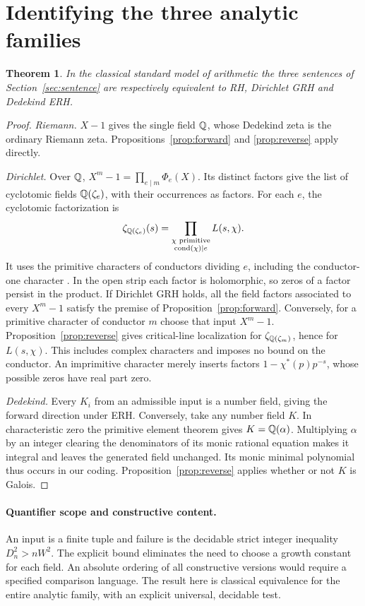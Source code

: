 \documentclass[11pt]{article}
\newtheorem{theorem}{Theorem}\newtheorem{lemma}[theorem]{Lemma}\newtheorem{proposition}[theorem]{Proposition}
\begin{document}
\section{Identifying the three analytic families}\label{sec:families}
\begin{theorem}\label{thm:main}
In the classical standard model of arithmetic the three sentences of Section~\ref{sec:sentence} are respectively equivalent to RH, Dirichlet GRH and Dedekind ERH.
\end{theorem}
\begin{proof}
\emph{Riemann.} \(X-1\) gives the single field \(\mathbb Q\), whose Dedekind zeta is the ordinary Riemann zeta. Propositions~\ref{prop:forward} and \ref{prop:reverse} apply directly.

\emph{Dirichlet.} Over \(\mathbb Q\), \(X^m-1=\prod_{e\mid m}\Phi_e(X)\). Its distinct factors give the list of cyclotomic fields \(\mathbb Q(\zeta_e)\), with their occurrences as factors. For each \(e\), the cyclotomic factorization is
\[
 \zeta_{\mathbb Q(\zeta_e)}(s)
    =\prod_{\substack{\chi\text{ primitive}\\\operatorname{cond}(\chi)\mid e}} L(s,\chi).
\]
It uses the primitive characters of conductors dividing \(e\), including the conductor-one character \cite[Thm.~19.15]{suth}. In the open strip each factor is holomorphic, so zeros of a factor persist in the product. If Dirichlet GRH holds, all the field factors associated to every \(X^m-1\) satisfy the premise of Proposition~\ref{prop:forward}. Conversely, for a primitive character of conductor \(m\) choose that input \(X^m-1\). Proposition~\ref{prop:reverse} gives critical-line localization for \(\zeta_{\mathbb Q(\zeta_m)}\), hence for \(L(s,\chi)\). This includes complex characters and imposes no bound on the conductor. An imprimitive character merely inserts factors \(1-\chi^*(p)p^{-s}\), whose possible zeros have real part zero.

\emph{Dedekind.} Every \(K_i\) from an admissible input is a number field, giving the forward direction under ERH. Conversely, take any number field \(K\). In characteristic zero the primitive element theorem gives \(K=\mathbb Q(\alpha)\). Multiplying \(\alpha\) by an integer clearing the denominators of its monic rational equation makes it integral and leaves the generated field unchanged. Its monic minimal polynomial thus occurs in our coding. Proposition~\ref{prop:reverse} applies whether or not \(K\) is Galois.
\end{proof}

\paragraph{Quantifier scope and constructive content.}
An input is a finite tuple and failure is the decidable strict integer inequality \(D_n^2>nW^2\). The explicit bound eliminates the need to choose a growth constant for each field. An absolute ordering of all constructive versions would require a specified comparison language. The result here is classical equivalence for the entire analytic family, with an explicit universal, decidable test.
\end{document}
